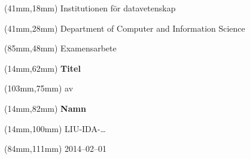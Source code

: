 \documentclass[a4paper]{memoir}
\begin{document}
\pagestyle{empty}
\fontsize{29}{35pt}\selectfont
\begin{textblock*}{127mm}(41mm,18mm)
  Institutionen för datavetenskap
\end{textblock*}

\fontsize{18}{35pt}\selectfont
\begin{textblock*}{127mm}(41mm,28mm)
Department of Computer and Information Science
\end{textblock*}

\fontsize{18}{35pt}\selectfont
\begin{textblock*}{39mm}(85mm,48mm)
  Examensarbete
\end{textblock*}

\fontsize{24}{29pt}\selectfont
\begin{textblock*}{175mm}(14mm,62mm)
  \hspace*{\fill}\textbf{Titel}\hspace*{\fill}
\end{textblock*}

\fontsize{12}{14pt}\selectfont
\begin{textblock*}{4mm}(103mm,75mm)
  av
\end{textblock*}

\fontsize{24}{29pt}\selectfont
\begin{textblock*}{175mm}(14mm,82mm)
  \hspace*{\fill}\textbf{Namn}\hspace*{\fill}
\end{textblock*}


\fontsize{18}{22pt}\selectfont
\begin{textblock*}{175mm}(14mm,100mm)
  \hspace*{\fill}LIU-IDA-\ldots\hspace*{\fill}
\end{textblock*}

\fontsize{18}{22pt}\selectfont
\begin{textblock*}{46mm}(84mm,111mm)
  \hspace*{\fill}2014--02--01\hspace*{\fill}
\end{textblock*}
\end{document}
